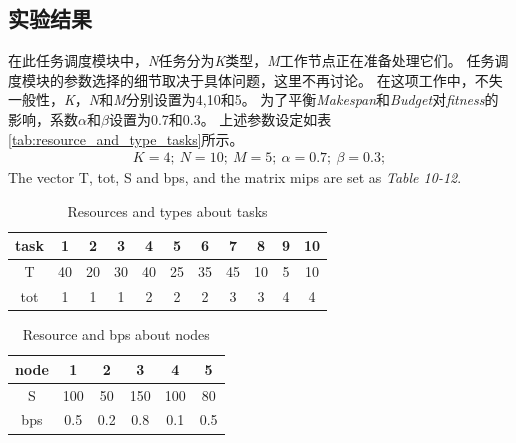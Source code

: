 \subsection{实验结果}
在此任务调度模块中，\emph{N}任务分为\emph{K}类型，\emph{M}工作节点正在准备处理它们。 任务调度模块的参数选择的细节取决于具体问题，这里不再讨论。 在这项工作中，不失一般性，\emph{K}，\emph{N}和\emph{M}分别设置为4,10和5。 为了平衡\emph{Makespan}和\emph{Budget}对\emph{fitness}的影响，系数$ \alpha $和$ \beta $设置为0.7和0.3。 上述参数设定如表\ref{tab:resource_and_type_tasks}所示。
\begin{eqnarray}\label{eqn:K_N_M}
    K=4;\ N=10;\ M=5;\ \alpha=0.7;\ \beta=0.3; 
\end{eqnarray}
The vector T, tot, S and bps, and the matrix mips are set as \emph{Table 10-12}.
\begin{table}[!htbp]
    \centering
    \caption{Resources and types about tasks}\label{tab:resource_type_tasks}
    \renewcommand\arraystretch{1.3} 
\begin{tabular}{*{11}{c}}
    \hline
   task& 1& 2& 3& 4& 5& 6& 7& 8& 9& 10\\
    \hline
   T & 40& 20& 30& 40& 25& 35& 45& 10& 5& 10 \\
    \hline
   tot &1& 1& 1& 2& 2& 2& 3& 3& 4& 4 \\
    \hline
   
   \end{tabular}
\end{table}

\begin{table}[!htbp]
    \centering
    \caption{Resource and bps about nodes}\label{tab:resource_bps_nodes_tasks}
    \renewcommand\arraystretch{1.3} 
\begin{tabular}{*{6}{c}}
    \hline
   node& 1& 2& 3& 4& 5\\
    \hline
   S & 100& 50& 150& 100& 80 \\
    \hline
   bps &0.5& 0.2& 0.8& 0.1& 0.5 \\
    \hline
   
   \end{tabular}
\end{table}

